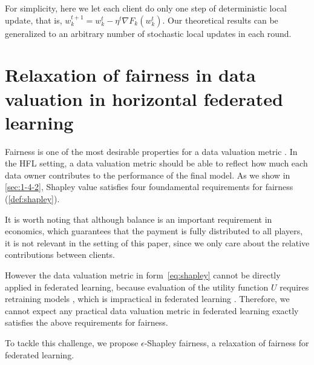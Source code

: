 For simplicity, here we let each client do only one step of deterministic local update, that is, $w_k^{t+1} = w_k^t - \eta^t \nabla F_k(w_k^t)$. Our theoretical results can be generalized to an arbitrary number of stochastic local updates in each round. 

\section{Relaxation of fairness in data valuation in horizontal federated learning} \label{sec:7-4}

Fairness is one of the most desirable properties for a data valuation metric \citep{ghorbani2019data,pei2020survey}. In the HFL setting, a data valuation metric should be able to reflect how much each data owner contributes to the performance of the final model. As we show in \autoref{sec:1-4-2}, Shapley value satisfies four foundamental requirements for fairness (\autoref{def:shapley}). 

It is worth noting that although balance is an important requirement in economics, which guarantees that the payment is fully distributed to all players, it is not relevant in the setting of this paper, since we only care about the relative contributions between clients. 

However the data valuation metric in form~\eqref{eq:shapley} cannot be directly applied in federated learning, because evaluation of the utility function $U$ requires retraining models \citep{ghorbani2019data}, which is impractical in federated learning \citep{wang2020principled}. Therefore, we cannot expect any practical data valuation metric in federated learning exactly satisfies the above requirements for fairness.

To tackle this challenge, we propose $\epsilon$-Shapley fairness, a relaxation of fairness for federated learning.

